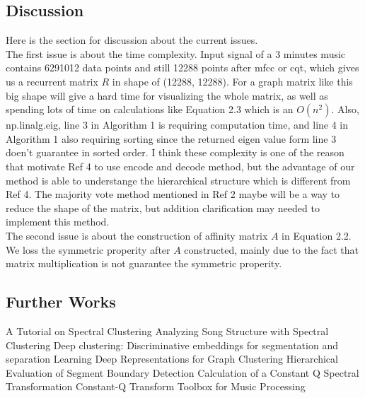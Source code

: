 \documentclass[final]{siamltexmm}
\begin{document}
\subsection{Discussion}
Here is the section for discussion about the current issues.\\
The first issue is about the time complexity. Input signal of a 3 minutes music contains 6291012 data points and still 12288 points after mfcc or cqt, which gives us a recurrent matrix $R$ in shape of (12288, 12288). For a graph matrix like this big shape will give a hard time for visualizing the whole matrix, as well as spending lots of time on calculations like Equation 2.3 which is an $O(n^2)$. Also, np.linalg.eig, line 3 in Algorithm 1 is requiring computation time, and line 4 in Algorithm 1 also requiring sorting since the returned eigen value form line 3 doen't guarantee in sorted order. I think these complexity is one of the reason that motivate Ref 4 to use encode and decode method, but the advantage of our method is able to understange the hierarchical structure which is different from Ref 4. The majority vote method mentioned in Ref 2 maybe will be a way to reduce the shape of the matrix, but addition clarification may needed to implement this method.\\
The second issue is about the construction of affinity matrix $A$ in Equation 2.2. We loss the symmetric properity after $A$ constructed, mainly due to the fact that matrix multiplication is not guarantee the symmetric properity.

\subsection{Further Works}

\begin{thebibliography}{10}
 {\sc A Tutorial on Spectral Clustering}
 {\sc Analyzing Song Structure with Spectral Clustering}
 {\sc Deep clustering: Discriminative embeddings for
segmentation and separation}
 {\sc Learning Deep Representations for Graph Clustering}
 {\sc Hierarchical Evaluation of Segment Boundary Detection}
 {\sc Calculation of a Constant Q Spectral Transformation}
 {\sc Constant-Q Transform Toolbox for Music Processing}
\end{thebibliography}
\end{document}
